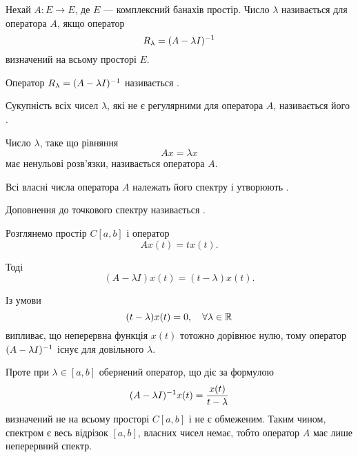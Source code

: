 \begin{definition}
Нехай $A: E \to E$, де $E$ --- комплексний банахів простір.
Число $\lambda$ називається  для
оператора $A$, якщо оператор
\begin{equation*}
    R_\lambda = (A - \lambda I)^{-1}
\end{equation*}
визначений на всьому просторі $E$.
\end{definition}

\begin{definition}
Оператор $R_\lambda = (A - \lambda I)^{-1}$ називається
.
\end{definition}

\begin{definition}
Сукупність всіх чисел $\lambda$, які не є регулярними
для оператора $A$, називається його .
\end{definition}

\begin{definition}
Число $\lambda$, таке що рівняння
\begin{equation*}
    Ax = \lambda x
\end{equation*}
має ненульові розв’язки,
називається  оператора $A$.
\end{definition}

\begin{definition}
Всі власні числа оператора $A$ належать його
спектру і утворюють .
\end{definition}

\begin{definition}
Доповнення до точкового спектру
називається .
\end{definition}

\begin{example}
Розглянемо простір $C[a, b]$ і оператор
\begin{equation*}
    A x(t) = t x(t).
\end{equation*}

Тоді
\begin{equation*}
    (A - \lambda I) x(t) = (t - \lambda) x(t).
\end{equation*}

Із умови
\begin{equation*}
    (t - \lambda) x(t) = 0, \quad \forall \lambda \in \mathbb{R}
\end{equation*}
випливає, що неперервна функція $x(t)$ тотожно дорівнює
нулю, тому оператор $(A - \lambda I)^{-1}$ існує для довільного $\lambda$.

Проте при $\lambda \in [a, b]$ обернений оператор, що діє за
формулою
\begin{equation*}
    (A - \lambda I)^{-1} x(t) = \frac{x(t)}{t - \lambda}
\end{equation*}
визначений не на всьому просторі $C[a, b]$ і не є
обмеженим. Таким чином, спектром є весь відрізок $[a, b]$,
власних чисел немає, тобто оператор $A$ має лише
неперервний спектр.
\end{example}

